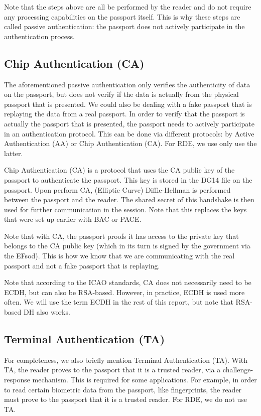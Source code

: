 Note that the steps above are all be performed by the reader and do not require any processing capabilities on the passport itself.
This is why these steps are called passive authentication: the passport does not actively participate in the authentication process.

\subsection{Chip Authentication (CA)}\label{subsec:chip-authentication}
The aforementioned passive authentication only verifies the authenticity of data on the passport, but does not verify if the data is actually from the physical passport that is presented.
We could also be dealing with a fake passport that is replaying the data from a real passport.
In order to verify that the passport is actually the passport that is presented, the passport needs to actively participate in an authentication protocol.
This can be done via different protocols: by Active Authentication (AA) or Chip Authentication (CA).
For RDE, we use only use the latter.

Chip Authentication (CA) is a protocol that uses the CA public key of the passport to authenticate the passport.
This key is stored in the DG14 file on the passport.
Upon perform CA, (Elliptic Curve) Diffie-Hellman is performed between the passport and the reader.
The shared secret of this handshake is then used for further communication in the session.
Note that this replaces the keys that were set up earlier with BAC or PACE.

Note that with CA, the passport proofs it has access to the private key that belongs to the CA public key (which in its turn is signed by the government via the EFsod).
This is how we know that we are communicating with the real passport and not a fake passport that is replaying.

Note that according to the ICAO standards, CA does not necessarily need to be ECDH, but can also be RSA-based.
However, in practice, ECDH is used more often.
We will use the term ECDH in the rest of this report, but note that RSA-based DH also works.

\subsection{Terminal Authentication (TA)}\label{subsec:terminal-authentication}
For completeness, we also briefly mention Terminal Authentication (TA).
With TA, the reader proves to the passport that it is a trusted reader, via a challenge-response mechanism.
This is required for some applications.
For example, in order to read certain biometric data from the passport, like fingerprints, the reader must prove to the passport that it is a trusted reader.
For RDE, we do not use TA.

